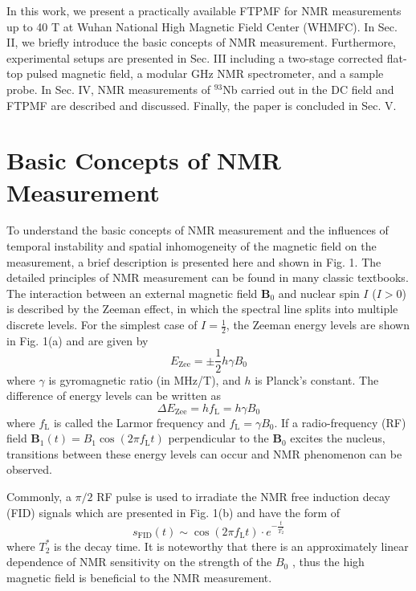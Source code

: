 \documentclass[lettersize,journal]{IEEEtran}
\begin{document}
In this work, we present a practically available FTPMF for NMR measurements up to 40 T at Wuhan National High Magnetic Field Center (WHMFC). In Sec. II, we briefly introduce the basic concepts of NMR measurement. Furthermore, experimental setups are presented in Sec. III including a two-stage corrected flat-top pulsed magnetic field, a modular GHz NMR spectrometer, and a sample probe. In Sec. IV, NMR measurements of $^{93}$Nb carried out in the DC field and FTPMF are described and discussed. Finally, the paper is concluded in Sec. V.

\section{Basic Concepts of NMR Measurement}
To understand the basic concepts of NMR measurement and the influences of temporal instability and spatial inhomogeneity of the magnetic field on the measurement, a brief description is presented here and shown in Fig. 1. The detailed principles of NMR measurement can be found in many classic textbooks\cite{levitt2013spin,slichter2013principles}. The interaction between an external magnetic field  $\boldsymbol{B}_0$ and nuclear spin $I$ ($I>0$) is described by the Zeeman effect, in which the spectral line splits into multiple discrete levels. For the simplest case of $I=\frac{1}{2}$, the Zeeman energy levels are shown in Fig. 1(a) and are given by
\begin{equation}
E_{\mathrm{Zee}}=\pm \frac{1}{2}h\gamma B_0
\end{equation}
where $\gamma$ is gyromagnetic ratio (in MHz/T), and $h$ is Planck's constant. The difference of energy levels can be written as
\begin{equation}
\varDelta E_{\mathrm{Zee}}=hf_{\mathrm{L}}=h\gamma B_0
\end{equation}
where $f_{\mathrm{L}}$ is called the Larmor frequency and $f_{\mathrm{L}}=\gamma B_0$. If a radio-frequency (RF) field $\boldsymbol{B}_1\left( t \right) =B_1\cos \left( 2\pi f_{\mathrm{L}}t \right)$ perpendicular to the $\boldsymbol{B}_0$ excites the nucleus,  transitions between these energy levels can occur and NMR phenomenon can be observed.

Commonly, a ${\pi /2}$  RF pulse is used to irradiate the NMR free induction decay (FID) signals which are presented in Fig. 1(b) and have the form of 
\begin{equation}
s_{\mathrm{FID}}\left( t \right) \sim \cos \left( 2\pi f_{\mathrm{L}}t \right) \cdot e^{-\frac{t}{T_{2}^{*}}}
\end{equation}
where $T_{2}^{*}$ is the decay time. It is noteworthy that there is an approximately linear dependence of  NMR sensitivity on the strength of the ${B}_0$ \cite{ref4}, thus the high magnetic field is beneficial to the NMR measurement.
\end{document}

